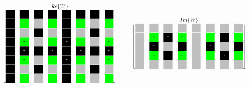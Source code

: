 \begin{minipage}{0.9\textwidth}
\begingroup
 \renewcommand*{\arraystretch}{0.95} %

\begin{center}
  \[
   \stackrel{\mbox{$Re\{W\}$}}{
    \begin{bmatrix}
     \myboxOnePos 	& \myboxOnePos 		& \myboxOnePos 	& \myboxOnePos 		& \myboxOnePos 	& \myboxOnePos 		& \myboxOnePos 	& \myboxOnePos \\
     \myboxOnePos 	& \myboxSqrtPos 	& \myboxZero 	& \myboxSqrtNeg		& \myboxOneNeg	& \myboxSqrtNeg		& \myboxZero	& \myboxSqrtPos \\
     \myboxOnePos 	& \myboxZero 		& \myboxOneNeg 	& \myboxZero 		& \myboxOnePos 	& \myboxZero 		& \myboxOneNeg 	& \myboxZero \\
     \myboxOnePos 	& \myboxSqrtNeg 	& \myboxZero 	& \myboxSqrtPos 	& \myboxOneNeg 	& \myboxSqrtPos 	& \myboxZero 	& \myboxSqrtNeg \\
     \myboxOnePos 	& \myboxOneNeg 		& \myboxOnePos 	& \myboxOneNeg 		& \myboxOnePos 	& \myboxOneNeg 		& \myboxOnePos 	& \myboxOneNeg \\
     \myboxOnePos 	& \myboxSqrtNeg 	& \myboxZero 	& \myboxSqrtPos 	& \myboxOneNeg 	& \myboxSqrtPos 	& \myboxZero 	& \myboxSqrtNeg \\
     \myboxOnePos 	& \myboxZero 		& \myboxOneNeg 	& \myboxZero 		& \myboxOnePos 	& \myboxZero 		& \myboxOneNeg 	& \myboxZero \\
     \myboxOnePos 	& \myboxSqrtPos 	& \myboxZero 	& \myboxSqrtNeg		& \myboxOneNeg	& \myboxSqrtNeg		& \myboxZero	& \myboxSqrtPos 
    \end{bmatrix}
   }
   \hspace{1cm}
   \stackrel{\mbox{$Im\{W\}$}}{
    \begin{bmatrix}
     \myboxZero 	& \myboxZero 		& \myboxZero 	& \myboxZero 		& \myboxZero 	& \myboxZero 		& \myboxZero 	& \myboxZero \\
     \myboxZero 	& \myboxSqrtNeg 	& \myboxOneNeg 	& \myboxSqrtNeg		& \myboxZero	& \myboxSqrtPos		& \myboxOnePos	& \myboxSqrtPos \\
     \myboxZero 	& \myboxOneNeg 		& \myboxZero 	& \myboxOnePos 		& \myboxZero 	& \myboxOneNeg 		& \myboxZero 	& \myboxOnePos \\
     \myboxZero 	& \myboxSqrtNeg 	& \myboxOnePos 	& \myboxSqrtNeg 	& \myboxZero 	& \myboxSqrtPos 	& \myboxOneNeg 	& \myboxSqrtPos \\
     \myboxZero 	& \myboxZero 		& \myboxZero 	& \myboxZero 		& \myboxZero 	& \myboxZero 		& \myboxZero 	& \myboxZero \\

\end{bmatrix}}\]
\end{center}
\end{minipage}
